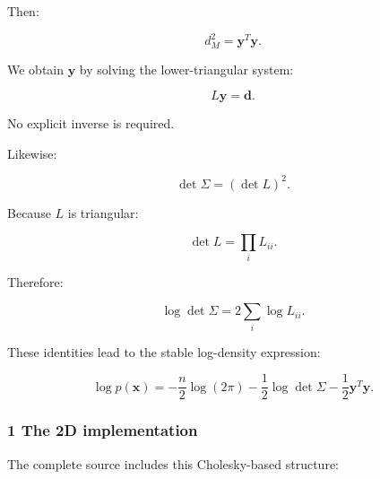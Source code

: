 Then:

\[
 \boxed{d_M^2=\mathbf y^T\mathbf y}.
\]

We obtain \(\mathbf y\) by solving the lower-triangular system:

\[
 L\mathbf y=\mathbf d.
\]

No explicit inverse is required.

Likewise:

\[
 \det\Sigma=(\det L)^2.
\]

Because \(L\) is triangular:

\[
 \det L=\prod_iL_{ii}.
\]

Therefore:

\[
 \boxed{ \log\det\Sigma = 2\sum_i\log L_{ii} }.
\]

These identities lead to the stable log-density expression:

\[
 \boxed{ \log p(\mathbf x)= -\frac n2\log(2\pi) -\frac12\log\det\Sigma -\frac12\mathbf y^T\mathbf y }.
\]

\subsubsection{1 The 2D implementation}\label{02-foundations-ii-ch031-the-2d-implementation}

The complete source includes this Cholesky-based structure:

